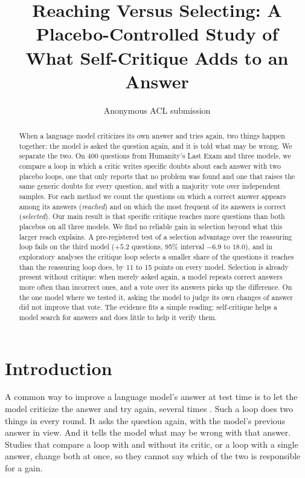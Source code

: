 \documentclass[11pt]{article}
\title{Reaching Versus Selecting: A Placebo-Controlled Study of\\What Self-Critique Adds to an Answer}
\author{Anonymous ACL submission}
\begin{document}
\maketitle

\begin{abstract}
When a language model criticizes its own answer and tries again, two things happen together: the model is asked the question again, and it is told what may be wrong.
We separate the two.
On 400 questions from Humanity's Last Exam and three models, we compare a loop in which a critic writes specific doubts about each answer with two placebo loops, one that only reports that no problem was found and one that raises the same generic doubts for every question, and with a majority vote over independent samples.
For each method we count the questions on which a correct answer appears among its answers (\emph{reached}) and on which the most frequent of its answers is correct (\emph{selected}).
Our main result is that specific critique reaches more questions than both placebos on all three models.
We find no reliable gain in selection beyond what this larger reach explains.
A pre-registered test of a selection advantage over the reassuring loop fails on the third model ($+5.2$ questions, 95\% interval $-6.9$ to $18.0$), and in exploratory analyses the critique loop selects a smaller share of the questions it reaches than the reassuring loop does, by 11 to 15 points on every model.
Selection is already present without critique: when merely asked again, a model repeats correct answers more often than incorrect ones, and a vote over its answers picks up the difference.
On the one model where we tested it, asking the model to judge its own changes of answer did not improve that vote.
The evidence fits a simple reading: self-critique helps a model search for answers and does little to help it verify them.
\end{abstract}

\section{Introduction}

A common way to improve a language model's answer at test time is to let the model criticize the answer and try again, several times \citep{madaan2023selfrefine,shinn2023reflexion}.
Such a loop does two things in every round.
It asks the question again, with the model's previous answer in view.
And it tells the model what may be wrong with that answer.
Studies that compare a loop with and without its critic, or a loop with a single answer, change both at once, so they cannot say which of the two is responsible for a gain.
\end{document}
